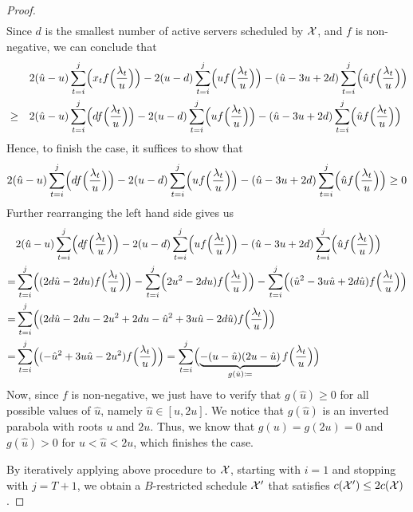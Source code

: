 \begin{proof}
\begin{align*}
\end{align*}
Since $d$ is the smallest number of active servers scheduled by $\mathcal{X}$, and $f$ is non-negative, we can conclude that
\begin{align*}
	&&&2(\hat{u}-u)\sum\limits_{t=i}^j\Bigl(x_tf\Bigl(\frac{\lambda_t}{u}\Bigr)\Bigr)-2(u-d)\sum\limits_{t=i}^j\Bigl(uf\Bigl(\frac{\lambda_t}{u}\Bigr)\Bigr)-(\hat{u}-3u+2d)\sum\limits_{t=i}^j\Bigl(\hat{u}f\Bigl(\frac{\lambda_t}{u}\Bigr)\Bigr)\\
	&\ge&&2(\hat{u}-u)\sum\limits_{t=i}^j\Bigl(df\Bigl(\frac{\lambda_t}{u}\Bigr)\Bigr)-2(u-d)\sum\limits_{t=i}^j\Bigl(uf\Bigl(\frac{\lambda_t}{u}\Bigr)\Bigr)-(\hat{u}-3u+2d)\sum\limits_{t=i}^j\Bigl(\hat{u}f\Bigl(\frac{\lambda_t}{u}\Bigr)\Bigr)
\end{align*}
Hence, to finish the case, it suffices to show that
\begin{align*}
	2(\hat{u}-u)\sum\limits_{t=i}^j\Bigl(df\Bigl(\frac{\lambda_t}{u}\Bigr)\Bigr)-2(u-d)\sum\limits_{t=i}^j\Bigl(uf\Bigl(\frac{\lambda_t}{u}\Bigr)\Bigr)-(\hat{u}-3u+2d)\sum\limits_{t=i}^j\Bigl(\hat{u}f\Bigl(\frac{\lambda_t}{u}\Bigr)\Bigr)\ge 0
\end{align*}
Further rearranging the left hand side gives us
\begin{align*}
	&2(\hat{u}-u)\sum\limits_{t=i}^j\Bigl(df\Bigl(\frac{\lambda_t}{u}\Bigr)\Bigr)-2(u-d)\sum\limits_{t=i}^j\Bigl(uf\Bigl(\frac{\lambda_t}{u}\Bigr)\Bigr)-(\hat{u}-3u+2d)\sum\limits_{t=i}^j\Bigl(\hat{u}f\Bigl(\frac{\lambda_t}{u}\Bigr)\Bigr)\\
	=&\sum\limits_{t=i}^j\Bigl((2d\hat{u}-2du)f\Bigl(\frac{\lambda_t}{u}\Bigr)\Bigr)-\sum\limits_{t=i}^j\Bigl(2u^2-2du)f\Bigl(\frac{\lambda_t}{u}\Bigr)\Bigr)-\sum\limits_{t=i}^j\Bigl((\hat{u}^2-3u\hat{u}+2d\hat{u})f\Bigl(\frac{\lambda_t}{u}\Bigr)\Bigr)\\
	=&\sum\limits_{t=i}^j\Bigl((2d\hat{u}-2du-2u^2+2du-\hat{u}^2+3u\hat{u}-2d\hat{u})f\Bigl(\frac{\lambda_t}{u}\Bigr)\Bigr)\\
	=&\sum\limits_{t=i}^j\Bigl((-\hat{u}^2+3u\hat{u}-2u^2)f\Bigl(\frac{\lambda_t}{u}\Bigr)\Bigr)=\sum\limits_{t=i}^j\Bigl(\underbrace{-(u-\hat{u})(2u-\hat{u})}_{g(\hat{u})\coloneqq}f\Bigl(\frac{\lambda_t}{u}\Bigr)\Bigr) 
\end{align*}
Now, since $f$ is non-negative, we just have to verify that $g(\hat{u})\ge0$ for all possible values of $\hat{u}$, namely $\hat{u}\in[u,2u]$. We notice that $g(\hat{u})$ is an inverted parabola with roots $u$ and $2u$. Thus, we know that $g(u)=g(2u)=0$ and $g(\hat{u})>0$ for $u<\hat{u}<2u$, which finishes the case.

By iteratively applying above procedure to $\mathcal{X}$, starting with $i=1$ and stopping with $j=T+1$, we obtain a $B$-restricted schedule $\mathcal{X}'$ that satisfies $c(\mathcal{X}')\le2c(\mathcal{X})$.
\end{proof}
